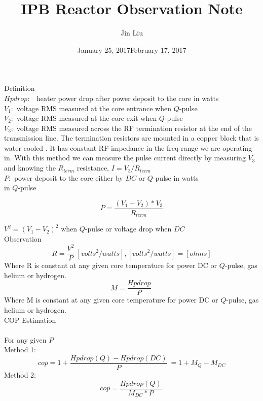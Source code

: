 \documentclass{article}
\title{IPB Reactor Observation Note}
\author{Jin Liu}
\date{January 25, 2017}
\date{February 17, 2017}
\begin{document}
\maketitle

Definition\\

$Hpdrop:$ \ heater power drop after power deposit to the core in watts\\

$V_{1}:$ voltage RMS measured at the core entrance when $Q$-pulse\\

$V_{2}:$ voltage RMS measured at the core exit when $Q$-pulse\\

$V_{3}:$ voltage RMS measured across the RF termination resistor at the end of the transmission line. The termination resistors are mounted in a copper block that is water cooled . It has constant RF impedance in the freq range we are operating in. With this method we can measure the pulse current directly by measuring $V_{3}$ and knowing the $R_{term}$ resistance, $I = V_{3} / R_{term}$ \\

$P:$ power deposit to the core either by $DC$ or $Q$-pulse in watts\\
in $Q$-pulse 

\begin{equation}
P=\frac{(V_{1}-V_{2})*V_{3}}{R_{term}} \label{1}%
\end{equation}
%

$V^{2}=(V_{1}-V_{2})^{2}$ when $Q$-pulse or voltage drop when $DC$ \\


Observation\\

\begin{equation}
R=\frac{V^{2}}{P}\ [volts^{2}/watts], [volts^{2}/watts]=[ohms]\label{3}%
\end{equation}
%
Where R is constant at any given core temperature for power DC or $Q$-pulse, gas helium or hydrogen.\\
\begin{equation}
M=\frac{Hpdrop}{P}\ \label{4}%
\end{equation}
%
Where M is constant at any given core temperature for power DC or $Q$-pulse, gas helium or hydrogen.\\

COP Estimation\\
\\
For any given $P$\\

Method 1:\\

\begin{equation}
cop=1+\frac{Hpdrop(Q) - Hpdrop(DC)}{P}\ = 1 + M_{Q}-M_{DC} \label{4}%
\end{equation}
Method 2:\\
\begin{equation}
cop=\frac{Hpdrop(Q)}{M_{DC}*P}\  \label{4}%
\end{equation}
%
\end{document}
